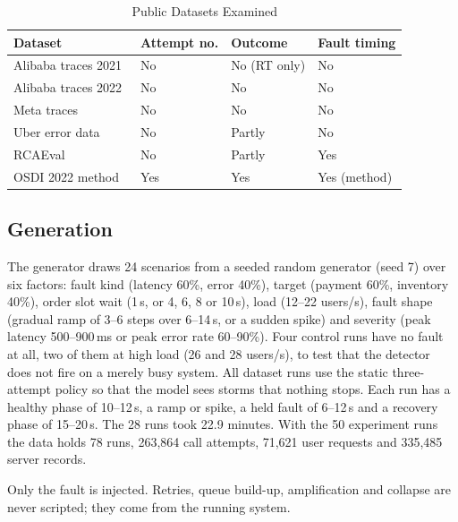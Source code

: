 \documentclass[conference,a4paper]{IEEEtran}
\begin{document}
\begin{table}[!t]
\caption{Public Datasets Examined}
\label{tab:datasets}
\centering
\small
\begin{tabular}{|L{2.6cm}|L{1.15cm}|L{1.3cm}|L{1.3cm}|}
\hline
\textbf{Dataset} & \textbf{Attempt no.} & \textbf{Outcome} & \textbf{Fault timing} \\ \hline
Alibaba traces 2021~\cite{alibaba2021} & No & No (RT only) & No \\ \hline
Alibaba traces 2022 & No & No & No \\ \hline
Meta traces~\cite{meta2023} & No & No & No \\ \hline
Uber error data~\cite{lee2024} & No & Partly & No \\ \hline
RCAEval~\cite{rcaeval2024} & No & Partly & Yes \\ \hline
OSDI 2022 method~\cite{huang2022} & Yes & Yes & Yes (method) \\ \hline
\end{tabular}
\end{table}

\subsection{Generation}
The generator draws 24 scenarios from a seeded random generator (seed 7) over six factors: fault kind (latency 60\%, error 40\%), target (payment 60\%, inventory 40\%), order slot wait (1\,s, or 4, 6, 8 or 10\,s), load (12--22 users/s), fault shape (gradual ramp of 3--6 steps over 6--14\,s, or a sudden spike) and severity (peak latency 500--900\,ms or peak error rate 60--90\%). Four control runs have no fault at all, two of them at high load (26 and 28 users/s), to test that the detector does not fire on a merely busy system. All dataset runs use the static three-attempt policy so that the model sees storms that nothing stops. Each run has a healthy phase of 10--12\,s, a ramp or spike, a held fault of 6--12\,s and a recovery phase of 15--20\,s. The 28 runs took 22.9 minutes. With the 50 experiment runs the data holds 78 runs, 263,864 call attempts, 71,621 user requests and 335,485 server records.

Only the fault is injected. Retries, queue build-up, amplification and collapse are never scripted; they come from the running system.
\end{document}
